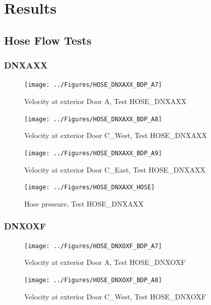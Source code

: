 \documentclass[11pt,oneside]{book}
\begin{document}
\chapter{Results}
\label{chap:Results}

\section{Hose Flow Tests}

\subsection{DNXAXX}

\begin{figure}[!ht]
\texttt{[image: ../Figures/HOSE\_DNXAXX\_BDP\_A7]}
\caption{Velocity at exterior Door A, Test HOSE\_DNXAXX}
\label{fig:HOSE_DNXAXX_BDP_A7}
\end{figure}

\begin{figure}[!ht]
\texttt{[image: ../Figures/HOSE\_DNXAXX\_BDP\_A8]}
\caption{Velocity at exterior Door C\_West, Test HOSE\_DNXAXX}
\label{fig:HOSE_DNXAXX_BDP_A8}
\end{figure}

\begin{figure}[!ht]
\texttt{[image: ../Figures/HOSE\_DNXAXX\_BDP\_A9]}
\caption{Velocity at exterior Door C\_East, Test HOSE\_DNXAXX}
\label{fig:HOSE_DNXAXX_BDP_A9}
\end{figure}

\begin{figure}[!ht]
\texttt{[image: ../Figures/HOSE\_DNXAXX\_HOSE]}
\caption{Hose pressure, Test HOSE\_DNXAXX}
\label{fig:HOSE_DNXAXX_HOSE}
\end{figure}


\clearpage


\subsection{DNXOXF}

\begin{figure}[!ht]
\texttt{[image: ../Figures/HOSE\_DNXOXF\_BDP\_A7]}
\caption{Velocity at exterior Door A, Test HOSE\_DNXOXF}
\label{fig:HOSE_DNXOXF_BDP_A7}
\end{figure}

\begin{figure}[!ht]
\texttt{[image: ../Figures/HOSE\_DNXOXF\_BDP\_A8]}
\caption{Velocity at exterior Door C\_West, Test HOSE\_DNXOXF}
\label{fig:HOSE_DNXOXF_BDP_A8}
\end{figure}
\end{document}
